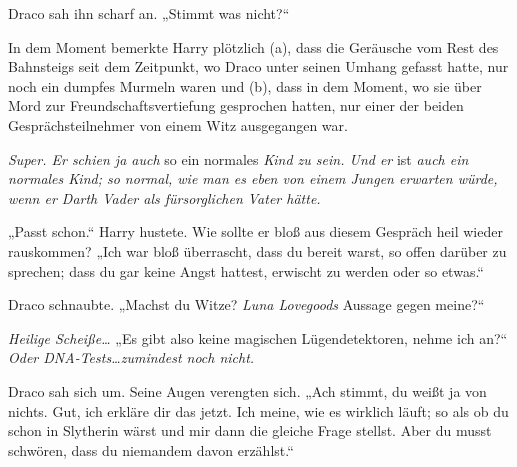 Draco sah ihn scharf an. „Stimmt was nicht?“

In dem Moment bemerkte Harry plötzlich (a), dass die Geräusche vom Rest des Bahnsteigs seit dem Zeitpunkt, wo Draco unter seinen Umhang gefasst hatte, nur noch ein dumpfes Murmeln waren und (b), dass in dem Moment, wo sie über Mord zur Freundschaftsvertiefung gesprochen hatten, nur einer der beiden Gesprächsteilnehmer von einem Witz ausgegangen war.

\emph{Super. Er schien ja auch} so ein normales \emph{Kind zu sein. Und er} ist \emph{auch ein normales Kind; so normal, wie man es eben von einem Jungen erwarten würde, wenn er Darth Vader als fürsorglichen Vater hätte.}

„Passt schon.“ Harry hustete. Wie sollte er bloß aus diesem Gespräch heil wieder rauskommen? „Ich war bloß überrascht, dass du bereit warst, so offen darüber zu sprechen; dass du gar keine Angst hattest, erwischt zu werden oder so etwas.“

Draco schnaubte. „Machst du Witze? \emph{Luna Lovegoods} Aussage gegen meine?“

\emph{Heilige Scheiße…} „Es gibt also keine magischen Lügendetektoren, nehme ich an?“ \emph{Oder DNA-Tests…zumindest noch nicht.}

Draco sah sich um. Seine Augen verengten sich. „Ach stimmt, du weißt ja von nichts. Gut, ich erkläre dir das jetzt. Ich meine, wie es wirklich läuft; so als ob du schon in Slytherin wärst und mir dann die gleiche Frage stellst. Aber du musst schwören, dass du niemandem davon erzählst.“


